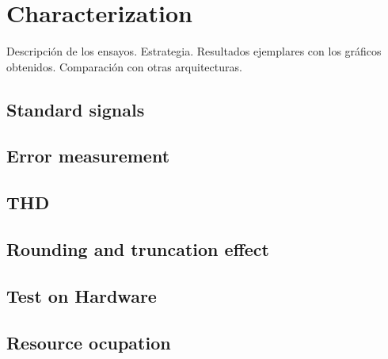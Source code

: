 \section{Characterization}
Descripción de los ensayos. Estrategia. Resultados ejemplares con los gráficos obtenidos. Comparación con otras arquitecturas.
\subsection{Standard signals}
\subsection{Error measurement}
\subsection{THD}
\subsection{Rounding and truncation effect}
\subsection{Test on Hardware}
\subsection{Resource ocupation}